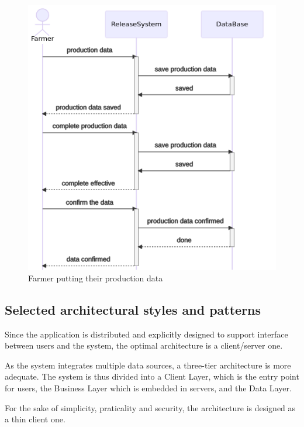 \begin{figure} [!h]
	\centering
	\includegraphics[width=\textwidth]{Images/seq_request_prod_data.png}
	\caption{\label{fig:seq_request_prod_data} Farmer putting their production data}
\end{figure}

\subsection{Selected architectural styles and patterns}
Since the application is distributed and explicitly designed to support interface between users and the system, the optimal architecture is a client/server one. 

As the system integrates multiple data sources, a three-tier architecture is more adequate. The system is thus divided into a Client Layer, which is the entry point for users, the Business Layer which is embedded in servers, and the Data Layer. 

For the sake of simplicity, praticality and security, the architecture is designed as a thin client one.
